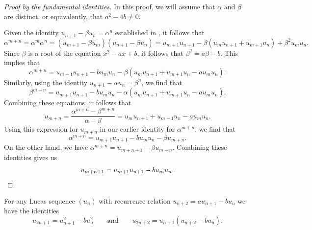 \begin{proof}[Proof by the fundamental identities]
  In this proof, we will assume that $\alpha$ and $\beta$ are distinct, or equivalently, that $a^2-4b\neq 0$.

  Given the identity $u_{n+1}-\beta u_n=\alpha^n$ established in , it follows that
  \begin{equation*}
    \alpha^{m+n}=\alpha^m\alpha^n=(u_{m+1}-\beta u_m)(u_{n+1}-\beta u_n)= u_{m+1}u_{n+1} - \beta(u_mu_{n+1}+u_{m+1}u_n)+\beta^2u_mu_n.
  \end{equation*}
  Since $\beta$ is a root of the equation $x^2-ax+b$, it follows that $\beta^2=a\beta-b$. This implies that
  \begin{equation*}
    \alpha^{m+n}=u_{m+1}u_{n+1}-bu_mu_n - \beta(u_mu_{n+1}+u_{m+1}u_n-au_mu_n).
  \end{equation*}  
  Similarly, using the identity $u_{n+1}-\alpha u_n=\beta^n$, we find that
  \begin{equation*}
    \beta^{m+n}=u_{m+1}u_{n+1}-bu_mu_n - \alpha(u_mu_{n+1}+u_{m+1}u_n-au_mu_n).
  \end{equation*}
  Combining these equations, it follows that
  \begin{equation*}
    u_{m+n}=\frac{\alpha^{m+n}-\beta^{m+n}}{\alpha-\beta} = u_mu_{n+1}+u_{m+1}u_n-au_mu_n.
  \end{equation*}
  Using this expression for $u_{m+n}$ in our earlier identity for $\alpha^{m+n}$, we find that
  \begin{equation*}
    \alpha^{m+n}=u_{m+1}u_{n+1}-bu_mu_n - \beta u_{m+n}.
  \end{equation*}
  On the other hand, we have $\alpha^{m+n}=u_{m+n+1}-\beta u_{m+n}$. Combining these identities gives us
  \begin{equation*}
    u_{m+n+1}=u_{m+1}u_{n+1}-bu_mu_n.\qedhere
  \end{equation*}
\end{proof}


\begin{corollary}\label{corollary:addition-formula-lucas-sequence}
  For any Lucas sequence $(u_n)$ with recurrence relation $u_{n+2}=au_{n+1}-bu_n$ we have the identities
  \begin{equation*}
    u_{2n+1}=u_{n+1}^2-bu_n^2\qquad\text{and}\qquad u_{2n+2}=u_{n+1}(u_{n+2}-bu_n).
  \end{equation*}
\end{corollary}

